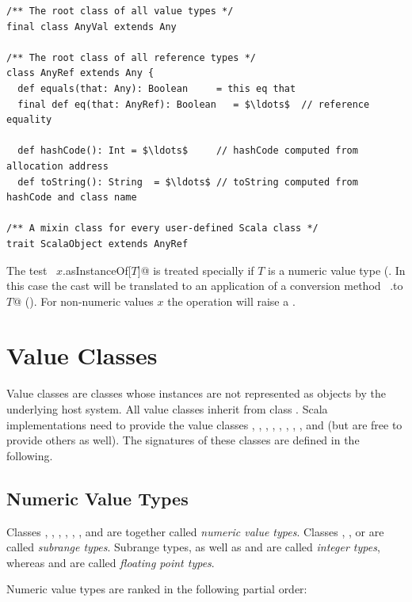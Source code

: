 {\begin{lstlisting}
/** The root class of all value types */
final class AnyVal extends Any 

/** The root class of all reference types */
class AnyRef extends Any {
  def equals(that: Any): Boolean     = this eq that 
  final def eq(that: AnyRef): Boolean   = $\ldots$  // reference equality
  
  def hashCode(): Int = $\ldots$     // hashCode computed from allocation address
  def toString(): String  = $\ldots$ // toString computed from hashCode and class name

/** A mixin class for every user-defined Scala class */
trait ScalaObject extends AnyRef 
\end{lstlisting}

The test ~\lstinline@$x$.asInstanceOf[$T$]@ is treated specially if $T$ is a
numeric value type (. In this case the cast will
be translated to an application of a conversion method ~\lstinline@x.to$T$@ 
(). For non-numeric values $x$ the operation will raise a
.

\section{Value Classes}
\label{sec:cls-value}

Value classes are classes whose instances are not represented as
objects by the underlying host system.  All value classes inherit from
class . Scala implementations need to provide the
value classes , , , ,
, , , , and 
(but are free to provide others as well).
The signatures of these classes are defined in the following.

\subsection{Numeric Value Types} \label{cls:numeric-value}

Classes , ,
, , , , and 
are together called {\em numeric value types}. Classes ,
, or  are called {\em subrange types}.
Subrange types, as well as  and  are called {\em
integer types}, whereas  and  are called {\em
floating point types}.

Numeric value types are ranked in the following partial order:

}
